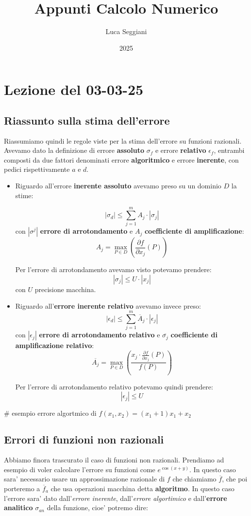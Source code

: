 \documentclass[a4paper,11pt]{article}
\title{Appunti Calcolo Numerico}
\author{Luca Seggiani}
\date{2025}
\begin{document}
\section{Lezione del 03-03-25}

\thispagestyle{empty}
\pagestyle{fancy}

\subsection{Riassunto sulla stima dell'errore}
Riassumiamo quindi le regole viste per la stima dell'errore su funzioni razionali.
Avevamo dato la definizione di errore \textbf{assoluto} $\sigma_f$ e errore \textbf{relativo} $\epsilon_f$, entrambi composti da due fattori denominati errore \textbf{algoritmico} e errore \textbf{inerente}, con pedici rispettivamente $a$ e $d$.

\begin{itemize}
	\item 
Riguardo all'errore \textbf{inerente assoluto} avevamo preso su un dominio $D$ la stime:

$$
|\sigma_d| \leq \sum_{j = 1}^m A_j \cdot |\sigma_j|
$$
con $|\sigma^j|$ \textbf{errore di arrotondamento} e $A_j$ \textbf{coefficiente di amplificazione}:
$$
A_j = \max_{P \in D} \left( \frac{\partial f}{\partial x_j}(P) \right)
$$

Per l'errore di arrotondamento avevamo visto potevamo prendere:
$$
|\sigma_j| \leq U \cdot |x_j|
$$
con $U$ precisione macchina.

	\item
Riguardo all'\textbf{errore inerente relativo} avevamo invece preso:
$$
|\epsilon_d|\leq \sum_{j = 1}^m \overline{A}_j \cdot |\epsilon_j|
$$
con
$|\epsilon_j|$ \textbf{errore di arrotondamento relativo} e $\overline{\sigma_j}$ \textbf{coefficiente di amplificazione relativo}:
$$
\overline{A_j} = \max_{P \in D} \left( \frac{x_j \cdot \frac{\partial f}{\partial x_j} (P) }{f(P)} \right)
$$

Per l'errore di arrotondamento relativo potevamo quindi prendere:
$$
|\epsilon_j| \leq U
$$
\end{itemize}

# esempio errore algortmico di $f(x_1, x_2) = (x_1 + 1) x_1 + x_2$

\subsection{Errori di funzioni non razionali}
Abbiamo finora trascurato il caso di funzioni non razionali.
Prendiamo ad esempio di voler calcolare l'errore su funzioni come $e^{\cos(x + y)}$.
In questo caso sara' necessario usare un approssimazione razionale di $f$ che chiamiamo $\overline{f}$, che poi porteremo a $\overline{f}_a$ che usa operazioni macchina detta \textbf{algoritmo}.
In questo caso l'errore sara' dato dall'\textit{errore inerente}, dall'\textit{errore algortimico} e dall'\textbf{errore analitico} $\sigma_{an}$ della funzione, cioe' potremo dire:
\end{document}
